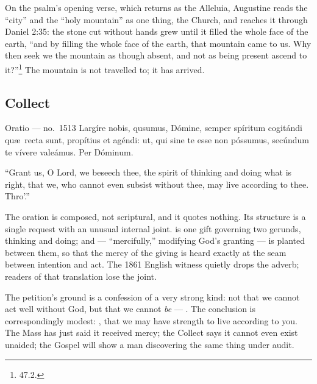 On the psalm's opening verse, which returns as the Alleluia, Augustine reads
the ``city'' and the ``holy mountain'' as one thing, the Church, and reaches it
through Daniel 2:35: the stone cut without hands grew until it filled the whole
face of the earth, ``and by filling the whole face of the earth, that mountain
came to us. Why then seek we the mountain as though absent, and not as being
present ascend to it{?}''\footnote{ 47.2.} The mountain is
not travelled to; it has arrived.

\subsection{Collect }

\begin{appointed}{Oratio --- no.\ 1513}
Largíre nobis, qu\aeacute sumus, Dómine, semper spíritum cogitándi qu\ae\ recta
sunt, propítius et agéndi: ut, qui sine te esse non póssumus, secúndum te
vívere valeámus. Per Dóminum.
\end{appointed}

\begin{englishwitness}
``Grant us, O Lord, we beseech thee, the spirit of thinking and doing what is
right, that we, who cannot even subsist without thee, may live according to
thee. Thro'.''
\end{englishwitness}

The oration is composed, not scriptural, and it quotes nothing. Its structure
is a single request with an unusual internal joint.  is one gift governing two gerunds, thinking and doing; and
 --- ``mercifully,'' modifying God's granting --- is planted
between them, so that the mercy of the giving is heard exactly at the seam
between intention and act. The 1861 English witness quietly drops the adverb;
readers of that translation lose the joint.

The petition's ground is a confession of a very strong kind: not that we cannot
act well without God, but that we cannot \emph{be} --- . The conclusion is correspondingly modest: , that we may have strength to live according to you. The Mass
has just said it received mercy; the Collect says it cannot even exist
unaided; the Gospel will show a man discovering the same thing under audit.

